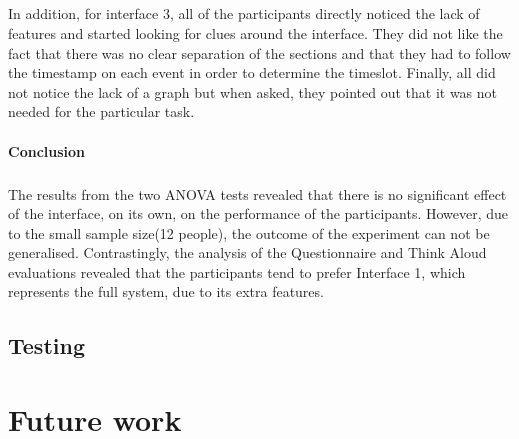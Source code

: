 \documentclass{l4proj}
\begin{document}
\paragraph{}
In addition, for interface 3, all of the participants directly noticed the lack of features and started looking for clues around the interface. They did not like the fact that there was no clear separation of the sections and that they had to follow the timestamp on each event in order to determine the timeslot. Finally, all did not notice the lack of a graph but when asked, they pointed out that it was not needed for the particular task.

\subsubsection{Conclusion}
\paragraph{}
The results from the two ANOVA tests revealed that there is no significant effect of the interface, on its own, on the performance of the participants. However, due to the small sample size(12 people), the outcome of the experiment can not be generalised. Contrastingly, the analysis of the Questionnaire and Think Aloud evaluations revealed that the participants tend to prefer Interface 1, which represents the full system, due to its extra features.      

\section{Testing}

\chapter{Future work}
\end{document}
